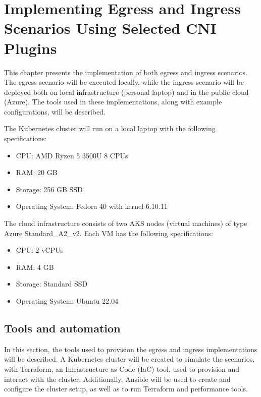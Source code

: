 \chapter{Implementing Egress and Ingress Scenarios Using Selected CNI Plugins}
\label{cha:practical_impl}

This chapter presents the implementation of both egress and ingress scenarios. The egress scenario will be executed locally, while the ingress scenario will be deployed both on local infrastructure (personal laptop) and in the public cloud (Azure). The tools used in these implementations, along with example configurations, will be described.

The Kubernetes cluster will run on a local laptop with the following specifications:
\begin{itemize}
  \item CPU: AMD Ryzen 5 3500U 8 CPUs
  \item RAM: 20 GB
  \item Storage: 256 GB SSD
  \item Operating System: Fedora 40 with kernel 6.10.11
\end{itemize}

The cloud infrastructure consists of two AKS nodes (virtual machines) of type Azure Standard\_A2\_v2. Each VM has the following specifications:
\begin{itemize}
  \item CPU: 2 vCPUs
  \item RAM: 4 GB
  \item Storage: Standard SSD
  \item Operating System: Ubuntu 22.04
\end{itemize}






\section{Tools and automation}
\label{sec:tools}

In this section, the tools used to provision the egress and ingress implementations will be described. A Kubernetes cluster will be created to simulate the scenarios, with Terraform, an Infrastructure as Code (IaC) tool, used to provision and interact with the cluster. Additionally, Ansible will be used to create and configure the cluster setup, as well as to run Terraform and performance tools.


